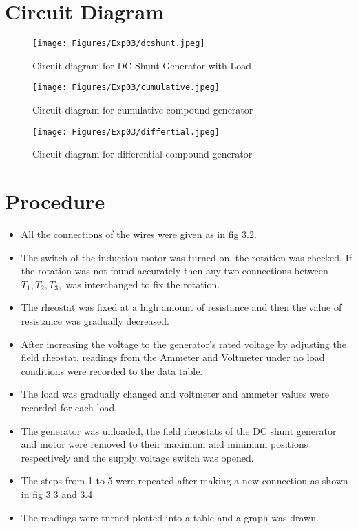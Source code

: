 \newpage

\section{Circuit Diagram}

\begin{figure}[hbt!]
\vspace{00mm}
    \centerline{\texttt{[image: Figures/Exp03/dcshunt.jpeg]}}
    \vspace{0mm}
    \caption{Circuit diagram for DC Shunt Generator with Load}
    \label{fig:figg2}
\end{figure}
\begin{figure}[hbt!]
\vspace{00mm}
    \centerline{\texttt{[image: Figures/Exp03/cumulative.jpeg]}}
    \vspace{0mm}
    \caption{Circuit diagram for cumulative compound generator}
    \label{fig:figg2}
\end{figure}
\begin{figure}[hbt!]
\vspace{00mm}
    \centerline{\texttt{[image: Figures/Exp03/differtial.jpeg]}}
    \vspace{0mm}
    \caption{Circuit diagram for differential compound generator}
    \label{fig:figg2}
\end{figure}
\FloatBarrier
\section{Procedure}
\begin{itemize}
    \item All the connections of the wires were given as in fig 3.2.
    \item The switch of the induction motor was turned on, the rotation was checked. If the rotation was not found accurately then any two connections between $T_1, T_2, T_3,$ was interchanged to fix the rotation. 
    \item The rheostat was fixed at a high amount of resistance and then the value of resistance was gradually decreased.
    \item After increasing the voltage to the generator's rated voltage by adjusting the field rheostat, readings from the Ammeter and Voltmeter under no load conditions were recorded to the data table.
    \item The load was gradually changed and voltmeter and ammeter values were recorded for each load.
    \item The generator was unloaded, the field rheostats of the DC shunt generator and motor were removed to their maximum and minimum positions respectively and the supply voltage switch was opened.
    \item The steps from 1 to 5 were repeated after making a new connection as shown in fig 3.3 and 3.4
    \item The readings were turned plotted into a table and a graph was drawn.
\end{itemize}

